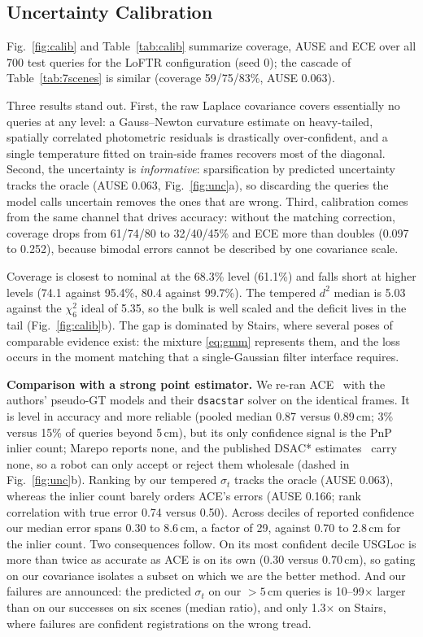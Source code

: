 \documentclass[journal]{IEEEtran}
\newcommand{\method}{USGLoc}
\begin{document}
\subsection{Uncertainty Calibration}
\label{sec:calib}
Fig.~\ref{fig:calib} and Table~\ref{tab:calib} summarize coverage, AUSE and ECE over all 700 test queries for the LoFTR configuration (seed 0); the cascade of Table~\ref{tab:7scenes} is similar (coverage 59/75/83\%, AUSE 0.063).

Three results stand out. First, the raw Laplace covariance covers essentially no queries at any level: a Gauss--Newton curvature estimate on heavy-tailed, spatially correlated photometric residuals is drastically over-confident, and a single temperature fitted on train-side frames recovers most of the diagonal. Second, the uncertainty is \emph{informative}: sparsification by predicted uncertainty tracks the oracle (AUSE 0.063, Fig.~\ref{fig:unc}a), so discarding the queries the model calls uncertain removes the ones that are wrong. Third, calibration comes from the same channel that drives accuracy: without the matching correction, coverage drops from 61/74/80 to 32/40/45\% and ECE more than doubles (0.097 to 0.252), because bimodal errors cannot be described by one covariance scale.

Coverage is closest to nominal at the 68.3\% level (61.1\%) and falls short at higher levels (74.1 against 95.4\%, 80.4 against 99.7\%). The tempered $d^2$ median is 5.03 against the $\chi^2_6$ ideal of 5.35, so the bulk is well scaled and the deficit lives in the tail (Fig.~\ref{fig:calib}b). The gap is dominated by Stairs, where several poses of comparable evidence exist: the mixture \eqref{eq:gmm} represents them, and the loss occurs in the moment matching that a single-Gaussian filter interface requires.

\textbf{Comparison with a strong point estimator.} We re-ran ACE~\cite{ace} with the authors' pseudo-GT models and their \texttt{dsacstar} solver on the identical frames. It is level in accuracy and more reliable (pooled median 0.87 versus 0.89\,cm; 3\% versus 15\% of queries beyond 5\,cm), but its only confidence signal is the PnP inlier count; Marepo reports none, and the published DSAC* estimates~\cite{brachmann2021dslam} carry none, so a robot can only accept or reject them wholesale (dashed in Fig.~\ref{fig:unc}b). Ranking by our tempered $\sigma_t$ tracks the oracle (AUSE 0.063), whereas the inlier count barely orders ACE's errors (AUSE 0.166; rank correlation with true error 0.74 versus 0.50). Across deciles of reported confidence our median error spans 0.30 to 8.6\,cm, a factor of 29, against 0.70 to 2.8\,cm for the inlier count. Two consequences follow. On its most confident decile \method{} is more than twice as accurate as ACE is on its own (0.30 versus 0.70\,cm), so gating on our covariance isolates a subset on which we are the better method. And our failures are announced: the predicted $\sigma_t$ on our ${>}5$\,cm queries is 10--99$\times$ larger than on our successes on six scenes (median ratio), and only 1.3$\times$ on Stairs, where failures are confident registrations on the wrong tread.
\end{document}
